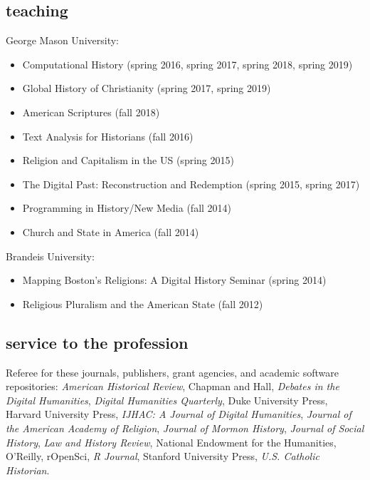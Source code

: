 \documentclass[11pt]{article}
\providecommand{\tightlist}{%
  \setlength{\itemsep}{0pt}\setlength{\parskip}{0pt}}
\begin{document}
\subsection{teaching}\label{teaching}

George Mason University:

\vspace{-0.15in}

\begin{itemize}
    \tightlist
  \item Computational History (spring 2016, spring 2017, spring 2018, spring 2019)
  \item Global History of Christianity (spring 2017, spring 2019)
  \item American Scriptures (fall 2018)
  \item Text Analysis for Historians (fall 2016)
  \item Religion and Capitalism in the US (spring 2015) 
  \item The Digital Past: Reconstruction and Redemption (spring 2015, spring 2017)
  \item Programming in History/New Media (fall 2014) 
  \item Church and State in America (fall 2014)
\end{itemize}

\vspace{-0.1in}

Brandeis University:

\vspace{-0.15in}

\begin{itemize}
    \tightlist
  \item
    Mapping Boston's Religions: A Digital History Seminar (spring 2014)
  \item
    Religious Pluralism and the American State (fall 2012)
\end{itemize}

\subsection{service to the profession}\label{service-profession}

Referee for these journals, publishers, grant agencies, and academic software 
repositories: \emph{American Historical Review}, Chapman and Hall, 
\emph{Debates in the Digital Humanities}, \emph{Digital Humanities Quarterly}, 
Duke University Press, Harvard University Press, \emph{IJHAC: A Journal of 
  Digital Humanities}, \emph{Journal of the American Academy of Religion}, 
\emph{Journal of Mormon History}, \emph{Journal of Social History}, \emph{Law 
  and History Review}, National Endowment for the Humanities, O'Reilly, 
rOpenSci, \emph{R Journal}, Stanford University Press, \emph{U.S. Catholic
Historian}.
\end{document}
